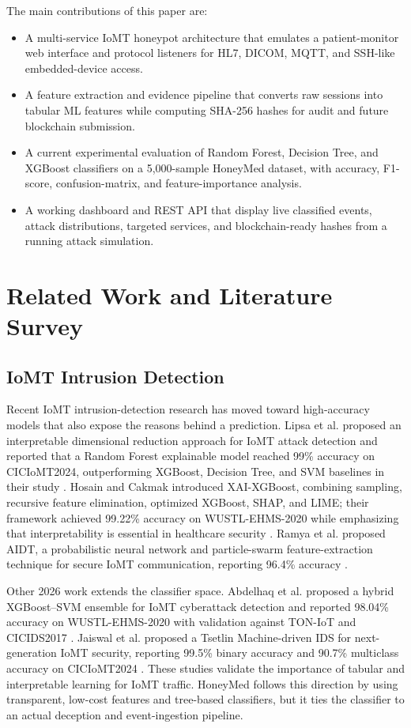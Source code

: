 \documentclass[conference, a4paper]{IEEEtran}
\begin{document}
The main contributions of this paper are:
\begin{itemize}
    \item A multi-service IoMT honeypot architecture that emulates a patient-monitor web interface and protocol listeners for HL7, DICOM, MQTT, and SSH-like embedded-device access.
    \item A feature extraction and evidence pipeline that converts raw sessions into tabular ML features while computing SHA-256 hashes for audit and future blockchain submission.
    \item A current experimental evaluation of Random Forest, Decision Tree, and XGBoost classifiers on a 5,000-sample HoneyMed dataset, with accuracy, F1-score, confusion-matrix, and feature-importance analysis.
    \item A working dashboard and REST API that display live classified events, attack distributions, targeted services, and blockchain-ready hashes from a running attack simulation.
\end{itemize}

\section{Related Work and Literature Survey}

\subsection{IoMT Intrusion Detection}
Recent IoMT intrusion-detection research has moved toward high-accuracy models that also expose the reasons behind a prediction. Lipsa et al. proposed an interpretable dimensional reduction approach for IoMT attack detection and reported that a Random Forest explainable model reached 99\% accuracy on CICIoMT2024, outperforming XGBoost, Decision Tree, and SVM baselines in their study \cite{lipsa2025interpretable}. Hosain and Cakmak introduced XAI-XGBoost, combining sampling, recursive feature elimination, optimized XGBoost, SHAP, and LIME; their framework achieved 99.22\% accuracy on WUSTL-EHMS-2020 while emphasizing that interpretability is essential in healthcare security \cite{hosain2025xaixgboost}. Ramya et al. proposed AIDT, a probabilistic neural network and particle-swarm feature-extraction technique for secure IoMT communication, reporting 96.4\% accuracy \cite{ramya2025aidt}.

Other 2026 work extends the classifier space. Abdelhaq et al. proposed a hybrid XGBoost--SVM ensemble for IoMT cyberattack detection and reported 98.04\% accuracy on WUSTL-EHMS-2020 with validation against TON-IoT and CICIDS2017 \cite{abdelhaq2026hybrid}. Jaiswal et al. proposed a Tsetlin Machine-driven IDS for next-generation IoMT security, reporting 99.5\% binary accuracy and 90.7\% multiclass accuracy on CICIoMT2024 \cite{jaiswal2026tsetlin}. These studies validate the importance of tabular and interpretable learning for IoMT traffic. HoneyMed follows this direction by using transparent, low-cost features and tree-based classifiers, but it ties the classifier to an actual deception and event-ingestion pipeline.
\end{document}
